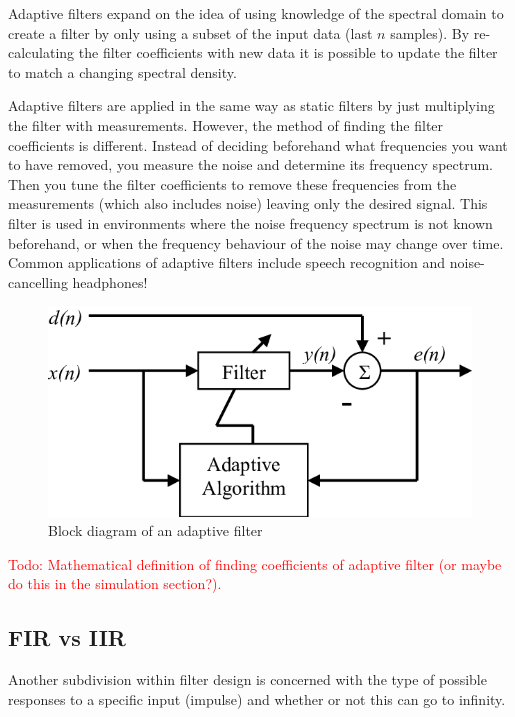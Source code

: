 Adaptive filters expand on the idea of using knowledge of the spectral domain to create a filter by only using a subset of the input data (last $n$ samples). By re-calculating the filter coefficients with new data it is possible to update the filter to match a changing spectral density. 

Adaptive filters are applied in the same way as static filters by just multiplying the filter with measurements. However, the  method of finding the filter coefficients is different. Instead of deciding beforehand what frequencies you want to have removed, you measure the noise and determine its frequency spectrum. Then you tune the filter coefficients to remove these frequencies from the measurements (which also includes noise) leaving only the desired signal. This filter is used in environments where the noise frequency spectrum is not known beforehand, or when the frequency behaviour of the noise may change over time. Common applications of adaptive filters include speech recognition and noise-cancelling headphones! \cite{wiener_vs_adaptive_realtime_noisecancellation}

\begin{figure}[h!t]
	\begin{center}
		\includegraphics[width=1.0\columnwidth]{images/adaptive_filter_block_diagram.png}
	\end{center}
	\caption{Block diagram of an adaptive filter \cite{adaptive_filter_block_diagram}}
	\label{fig:wiener_filter_response}
\end{figure}

\textcolor{red}{Todo: Mathematical definition of finding coefficients of adaptive filter (or maybe do this in the simulation section?). }


\subsection{FIR vs IIR}
Another subdivision within filter design is concerned with the type of possible responses to a specific input (impulse) and whether or not this can go to infinity.

